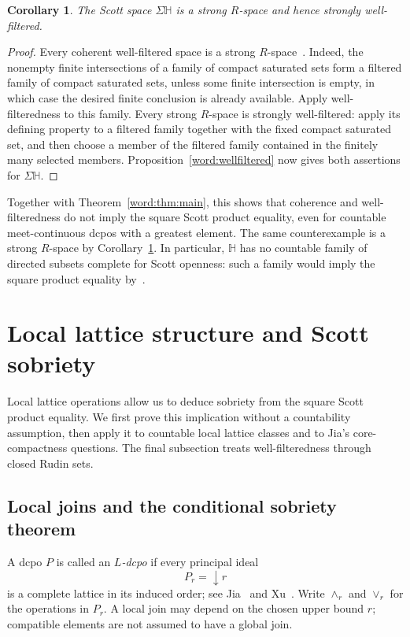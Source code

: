 \documentclass[fleqn,preprint,3p,a4paper]{elsarticle}
\newtheorem{corollary}[theorem]{Corollary}
\theoremstyle{definition}
\newcommand{\HH}{\mathbb H}
\begin{document}
\begin{corollary}\label{word:strong-R}
The Scott space $\Sigma\HH$ is a strong $R$-space and hence strongly well-filtered.
\end{corollary}
\begin{proof}
Every coherent well-filtered space is a strong $R$-space~\cite{XXC}. Indeed, the nonempty finite intersections of a family of compact saturated sets form a filtered family of compact saturated sets, unless some finite intersection is empty, in which case the desired finite conclusion is already available. Apply well-filteredness to this family. Every strong $R$-space is strongly well-filtered: apply its defining property to a filtered family together with the fixed compact saturated set, and then choose a member of the filtered family contained in the finitely many selected members. Proposition~\ref{word:wellfiltered} now gives both assertions for $\Sigma\HH$.
\end{proof}

Together with Theorem~\ref{word:thm:main}, this shows that coherence and well-filteredness do not imply the square Scott product equality, even for countable meet-continuous dcpos with a greatest element. The same counterexample is a strong $R$-space by Corollary~\ref{word:strong-R}. In particular, $\HH$ has no countable family of directed subsets complete for Scott openness: such a family would imply the square product equality by~\cite[Proposition~2.4(2)]{Xu}.

\section{Local lattice structure and Scott sobriety}\label{sec:local}
Local lattice operations allow us to deduce sobriety from the square Scott product equality. We first prove this implication without a countability assumption, then apply it to countable local lattice classes and to Jia's core-compactness questions. The final subsection treats well-filteredness through closed Rudin sets.

\subsection{Local joins and the conditional sobriety theorem}\label{local:subsec:joins}
A dcpo $P$ is called an \emph{$L$-dcpo} if every principal ideal
\[
 P_r={\downarrow} r
\]
is a complete lattice in its induced order; see Jia~\cite[Section~4.4]{Jia} and Xu~\cite[Definition~3.1]{Xu}. Write $\wedge_r$ and $\vee_r$ for the operations in $P_r$. A local join may depend on the chosen upper bound $r$; compatible elements are not assumed to have a global join.
\end{document}
